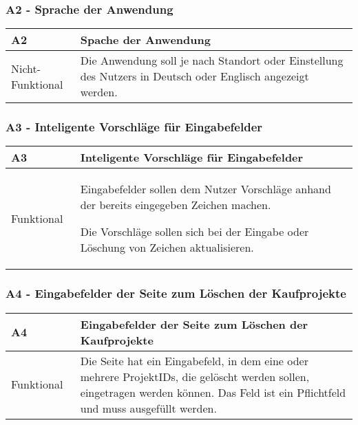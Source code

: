 \subsubsection[A2 - Sprache der Anwendung]{A2 - Sprache der Anwendung}

\begin{center}
    \begin{tabular}{ |p{0.2\linewidth}|p{0.8\linewidth}| } 
        \hline
        \rowcolor{lightgray}
        \textbf{A2} & \textbf{Spache der Anwendung} \\
        \hline
        Nicht-Funktional &  Die Anwendung soll je nach Standort oder Einstellung des Nutzers in Deutsch oder Englisch angezeigt werden.\\ 
        \hline
    \end{tabular}
\end{center}

\subsubsection[A3 - Inteligente Vorschläge für Eingabefelder]{A3 - Inteligente Vorschläge für Eingabefelder}

\begin{center}
    \begin{tabular}{ |p{0.2\linewidth}|p{0.8\linewidth}| } 
        \hline
        \rowcolor{lightgray}
        \textbf{A3} & \textbf{Inteligente Vorschläge für Eingabefelder} \\
        \hline
        Funktional & Eingabefelder sollen dem Nutzer Vorschläge anhand der bereits eingegeben Zeichen machen. 
        
        Die Vorschläge sollen sich bei der Eingabe oder Löschung von Zeichen aktualisieren. \\ 
        \hline
    \end{tabular}
\end{center}

\subsubsection[A4 - Eingabefelder der Seite zum Löschen der Kaufprojekte]{A4 - Eingabefelder der Seite zum Löschen der Kaufprojekte}

\begin{center}
    \begin{tabular}{ |p{0.2\linewidth}|p{0.8\linewidth}| } 
        \hline
        \rowcolor{lightgray}
        \textbf{A4} & \textbf{Eingabefelder der Seite zum Löschen der Kaufprojekte} \\
        \hline
        Funktional & Die Seite hat ein Eingabefeld, in dem eine oder mehrere ProjektIDs, die gelöscht werden sollen, eingetragen werden können. Das Feld ist ein Pflichtfeld und muss ausgefüllt werden. \\ 
        \hline
    \end{tabular}
\end{center}

